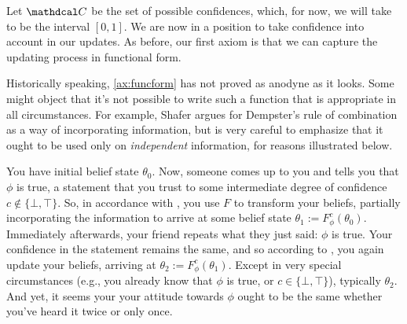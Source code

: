 \documentclass{uai2023}
\theoremstyle{plain}
\theoremstyle{definition}
\newcommand\confdom{\mathdcal C}
\begin{document}
Let $\confdom$ be the set of possible confidences, which, for now, we will take to be the interval $[0, 1]$.
We are now in a position to take confidence into account in our updates.
As before, our first axiom is that we can capture the updating process in functional form.




Historically speaking, \cref{ax:funcform} has not proved as anodyne as it looks.
Some might object that it's not possible to write such a function that is appropriate in all circumstances.
For example, Shafer argues for Dempster's rule of combination as a way of incorporating information, but is very careful to emphasize that it ought to be used only on \emph{independent} information, for reasons illustrated below.



\begin{example}\label{ex:dupl}
	You have initial belief state $\theta_0$.
	Now, someone comes up to you and tells you that $\phi$ is true, a statement
		that you trust to some intermediate degree of confidence $c \notin\{ \bot, \top\}$.
	So, in accordance with , you use $F$ to transform your beliefs, partially incorporating the information to arrive at some belief state $\theta_1 := F^c_\phi(\theta_0)$.
	Immediately afterwards, your friend repeats what they just said: $\phi$ is true.
	Your confidence in the statement remains the same, and so according to
	, you again update your beliefs, arriving at $\theta_2 := F^c_\phi(\theta_1)$.
	Except in very special circumstances (e.g., you already know that $\phi$ is true, or $c \in \{\bot,\top\}$), typically $\theta_2$.
	And yet, it seems your your attitude towards $\phi$ ought to be the same whether you've heard it twice or only once.
\end{example}
\end{document}
